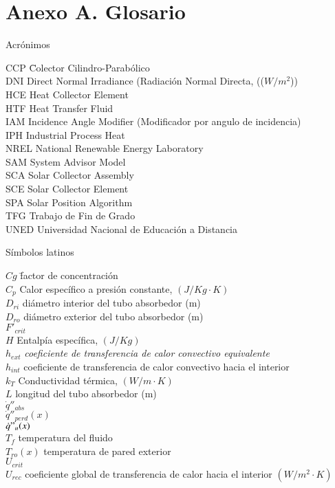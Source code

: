 \chapter* {Anexo A. Glosario}

Acrónimos

\begin{tabbing}	
CCP \quad\= Colector Cilindro-Parabólico  \\
DNI \> Direct Normal Irradiance (Radiación Normal Directa, (($W/m^2$)) \\
HCE \> Heat Collector Element \\
HTF \> Heat Transfer Fluid \\
IAM \> Incidence Angle Modifier (Modificador por angulo de incidencia) \\
IPH \> Industrial Process Heat \\
NREL \> National Renewable Energy Laboratory \\
SAM\> System Advisor Model \\
SCA \> Solar Collector Assembly\\
SCE \> Solar Collector Element \\
SPA \> Solar Position Algorithm \\
TFG	\>Trabajo de Fin de Grado \\
UNED \> Universidad Nacional de Educación a Distancia \\
\end{tabbing}


Símbolos latinos

\begin{tabbing}
$Cg$ \quad\=  factor de concentración \\
$C_p$ \> Calor específico a presión constante, $(J/Kg\cdot K)$ \\
$D_{ri}$  diámetro interior del tubo absorbedor (m) \\
$D_{ro}$ \> diámetro exterior del tubo absorbedor (m)   \\
$F'_{crit}$ \> \\
$H$ \> Entalpía específica, $(J/Kg)$ \\
$h_{ext}$ \> \textit{coeficiente de transferencia de calor convectivo equivalente} \\
$h_{int}$ \> coeficiente de transferencia de calor convectivo hacia el interior \\
$k_T$ \> Conductividad térmica, $(W/m \cdot K)$ \\
$L$  \> longitud del tubo absorbedor (m) \\
$\dot q''_{abs}$ \> \\
$\dot q''_{perd}(x)$ \> \\
$ \dot q"_{u}(x)$ \> \\ 
$T_{f}$ \> temperatura del fluido \\
$T_{ro}(x)$ \> temperatura de pared exterior \\
$U_{crit}$ \> \\
$U_{rec}$  \> coeficiente global de transferencia de calor hacia el interior $(W/m^{2}\cdot K)$  \\
\end{tabbing}


